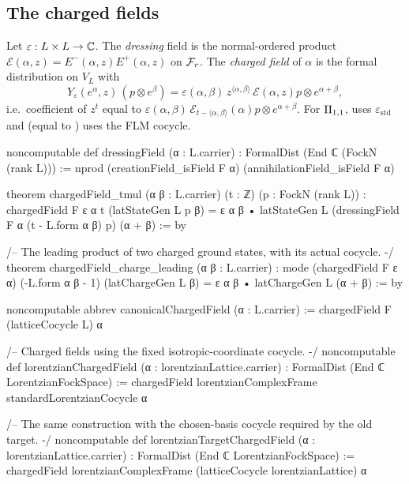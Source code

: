 \subsection{The charged fields}

\begin{definition}\label{ch17:def:charged}
Let $\varepsilon:L\times L\to{\mathbb{C}}$.  The \emph{dressing} field is the normal-ordered product
$\mathcal E(\alpha,z)=E^-(\alpha,z)E^+(\alpha,z)$ on $\mathcal{F}_r$.  The \emph{charged field} of $\alpha$ is the
formal distribution on $V_L$ with
\begin{equation}\label{ch17:eq:chargedfield}
  Y_\varepsilon(e^\alpha,z)\,(p\otimes e^\beta) = \varepsilon(\alpha,\beta)\,z^{\langle\alpha,\beta\rangle}\,
  \mathcal E(\alpha,z)p\otimes e^{\alpha+\beta},
\end{equation}
i.e.\ coefficient of $z^t$ equal to $\varepsilon(\alpha,\beta)\,\mathcal E_{t-\langle\alpha,\beta\rangle}(\alpha)p\otimes e^{\alpha+\beta}$.
For ${\mathrm{II}_{1,1}}$,  uses $\varepsilon_{\mathrm{std}}$ and
 (equal to ) uses the
FLM cocycle.
\end{definition}

\begin{leancode}
noncomputable def dressingField (α : L.carrier) : FormalDist (End ℂ (FockN (rank L))) :=
  nprod (creationField_isField F α) (annihilationField_isField F α)

theorem chargedField_tmul (α β : L.carrier) (t : ℤ) (p : FockN (rank L)) :
    chargedField F ε α t (latStateGen L p β)
      = ε α β • latStateGen L (dressingField F α (t - L.form α β) p) (α + β) := by

/-- The leading product of two charged ground states, with its actual cocycle. -/
theorem chargedField_charge_leading (α β : L.carrier) :
    mode (chargedField F ε α) (-L.form α β - 1) (latChargeGen L β) =
      ε α β • latChargeGen L (α + β) := by

noncomputable abbrev canonicalChargedField (α : L.carrier) :=
  chargedField F (latticeCocycle L) α

/-- Charged fields using the fixed isotropic-coordinate cocycle. -/
noncomputable def lorentzianChargedField (α : lorentzianLattice.carrier) :
    FormalDist (End ℂ LorentzianFockSpace) :=
  chargedField lorentzianComplexFrame standardLorentzianCocycle α

/-- The same construction with the chosen-basis cocycle required by the old target. -/
noncomputable def lorentzianTargetChargedField (α : lorentzianLattice.carrier) :
    FormalDist (End ℂ LorentzianFockSpace) :=
  chargedField lorentzianComplexFrame (latticeCocycle lorentzianLattice) α
\end{leancode}

